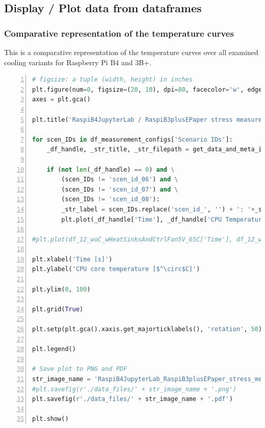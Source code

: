 \documentclass[10pt,parskip=half,
toc=sectionentrywithdots,
bibliography=totocnumbered,
captions=tableheading,numbers=noendperiod]{scrartcl}
\begin{document}
\hypertarget{display-plot-data-from-dataframes}{%
\subsection{Display / Plot data from
dataframes}\label{display-plot-data-from-dataframes}}

\hypertarget{comparative-representation-of-the-temperature-curves}{%
\subsubsection{Comparative representation of the temperature
curves}\label{comparative-representation-of-the-temperature-curves}}

This is a comparative representation of the temperature curves over all
examined cooling variants for Raspberry Pi B4 and 3B+.

\begin{lstlisting}[language=Python,numbers=left,xleftmargin=20pt,xrightmargin=5pt,belowskip=5pt,aboveskip=5pt]
# figsize: a tuple (width, height) in inches
plt.figure(num=0, figsize=(20, 10), dpi=80, facecolor='w', edgecolor='k')
axes = plt.gca()

plt.title('RaspiB4JupyterLab / RaspiB3plusEPaper stress measurements with different cooling types')

for scen_IDs in df_measurement_configs['Scenario IDs']:
    _df_handle, _str_title, _str_filepath = get_data_and_meta_infos_for_plotting(scen_IDs, df_measurement_configs, dict_of_df_records, dict_of_filenames)

    if (not len(_df_handle) == 0) and \
        (scen_IDs != 'scen_id_06') and \
        (scen_IDs != 'scen_id_07') and \
        (scen_IDs != 'scen_id_08'):
        _str_label = scen_IDs.replace('scen_id_', '') + ': '+_str_title
        plt.plot(_df_handle['Time'], _df_handle['CPU Temperature'], '-', label=_str_label)

#plt.plot(df_12_woC_wHeatSinksAndCtrlFan5V_65C['Time'], df_12_woC_wHeatSinksAndCtrlFan5V_65C['Ambient Temperature'], '-', label='Ambient Temperature')

plt.xlabel('Time [s]')
plt.ylabel('CPU core temperature [$^\circ$C]')

plt.ylim(0, 100)

plt.grid(True)

plt.setp(plt.gca().xaxis.get_majorticklabels(), 'rotation', 50)

plt.legend()

# Save plot to PNG and PDF
str_image_name = 'RaspiB4JupyterLab_RaspiB3plusEPaper_stress_measurement_all_scenarios_compared'
#plt.savefig(r'./data_files/' + str_image_name + '.png')
plt.savefig(r'./data_files/' + str_image_name + '.pdf')

plt.show()
\end{lstlisting}
\end{document}
